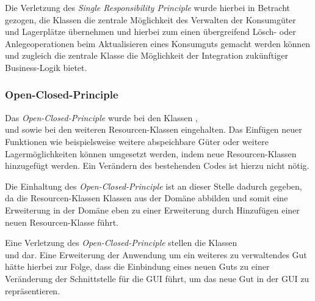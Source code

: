 Die Verletzung des \textit{Single Responsibility Principle} wurde hierbei in Betracht gezogen, die Klassen die zentrale Möglichkeit des Verwalten der Konsumgüter und Lagerplätze übernehmen und hierbei zum einen übergreifend Lösch- oder Anlegeoperationen beim Aktualisieren eines Konsumguts gemacht werden können und zugleich die zentrale Klasse die Möglichkeit der Integration zukünftiger Business-Logik bietet.

\subsubsection*{Open-Closed-Principle}
Das \textit{Open-Closed-Principle} wurde bei den Klassen \href{https://github.com/lucasmerkel/dhbw-advancedswe-programmentwurf/blob/5764d7da4cfd0562ed8e96128e92f85c30b7309d/swe_programmentwurf/consumergoods-inventory-planner/1-cip-adapters/src/main/java/de/dhbw/cip/adapters/ConsumerGoodsResource.java}{}, \\\href{https://github.com/lucasmerkel/dhbw-advancedswe-programmentwurf/blob/5764d7da4cfd0562ed8e96128e92f85c30b7309d/swe_programmentwurf/consumergoods-inventory-planner/1-cip-adapters/src/main/java/de/dhbw/cip/adapters/FridgeResource.java}{} und \href{https://github.com/lucasmerkel/dhbw-advancedswe-programmentwurf/blob/5764d7da4cfd0562ed8e96128e92f85c30b7309d/swe_programmentwurf/consumergoods-inventory-planner/1-cip-adapters/src/main/java/de/dhbw/cip/adapters/FoodShelfResource.java}{} sowie bei den weiteren Resourcen-Klassen eingehalten.
Das Einfügen neuer Funktionen wie beispielsweise weitere abspeichbare Güter oder weitere Lagermöglichkeiten können umgesetzt werden, indem neue Resourcen-Klassen hinzugefügt werden.
Ein Verändern des bestehenden Codes ist hierzu nicht nötig.

Die Einhaltung des \textit{Open-Closed-Principle} ist an dieser Stelle dadurch gegeben, da die Resourcen-Klassen Klassen aus der Domäne abbilden und somit eine Erweiterung in der Domäne eben zu einer Erweiterung durch Hinzufügen einer neuen Resourcen-Klasse führt. 

Eine Verletzung des \textit{Open-Closed-Principle} stellen die Klassen \\\href{https://github.com/lucasmerkel/dhbw-advancedswe-programmentwurf/blob/5764d7da4cfd0562ed8e96128e92f85c30b7309d/swe_programmentwurf/consumergoods-inventory-planner/0-cip-plugins/src/main/java/de/dhbw/cip/plugins/rest/ConsumerGoodsGuiController.java}{} und \href{https://github.com/lucasmerkel/dhbw-advancedswe-programmentwurf/blob/5764d7da4cfd0562ed8e96128e92f85c30b7309d/swe_programmentwurf/consumergoods-inventory-planner/0-cip-plugins/src/main/java/de/dhbw/cip/plugins/rest/StorageGuiController.java}{} dar.
Eine Erweiterung der Anwendung um ein weiteres zu verwaltendes Gut hätte hierbei zur Folge, dass die Einbindung eines neuen Guts zu einer Veränderung der Schnittstelle für die \ac{GUI} führt, um das neue Gut in der \ac{GUI} zu repräsentieren.

